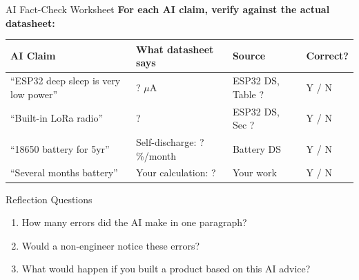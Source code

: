 \documentclass[aspectratio=169,11pt]{beamer}
\begin{document}
\begin{frame}{AI Fact-Check Worksheet}
    \textbf{For each AI claim, verify against the actual datasheet:}
    
    \vspace{0.3cm}
    \begin{center}
    \begin{tabular}{p{3cm}p{3.5cm}p{2.5cm}p{2.5cm}}
        \toprule
        \textbf{AI Claim} & \textbf{What datasheet says} & \textbf{Source} & \textbf{Correct?} \\
        \midrule
        ``ESP32 deep sleep is very low power'' & ? $\mu$A & ESP32 DS, Table ? & Y / N \\
        \addlinespace
        ``Built-in LoRa radio'' & ? & ESP32 DS, Sec ? & Y / N \\
        \addlinespace
        ``18650 battery for 5yr'' & Self-discharge: ?\%/month & Battery DS & Y / N \\
        \addlinespace
        ``Several months battery'' & Your calculation: ? & Your work & Y / N \\
        \bottomrule
    \end{tabular}
    \end{center}
    
    \vspace{0.3cm}
    \begin{exampleblock}{Reflection Questions}
        \begin{enumerate}
            \item How many errors did the AI make in one paragraph?
            \item Would a non-engineer notice these errors?
            \item What would happen if you built a product based on this AI advice?
        \end{enumerate}
    \end{exampleblock}
\end{frame}
\end{document}
